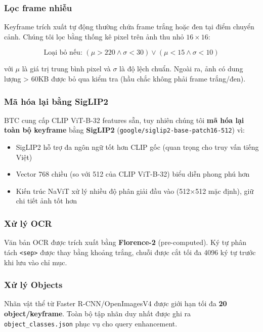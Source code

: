 \documentclass[12pt,a4paper,onecolumn]{article}
\begin{document}
\subsubsection{Lọc frame nhiễu}

Keyframe trích xuất tự động thường chứa frame trắng hoặc đen tại điểm chuyển cảnh. Chúng tôi lọc bằng thống kê pixel trên ảnh thu nhỏ $16 \times 16$:

$$\text{Loại bỏ nếu: } (\mu > 220 \wedge \sigma < 30) \vee (\mu < 15 \wedge \sigma < 10)$$

với $\mu$ là giá trị trung bình pixel và $\sigma$ là độ lệch chuẩn. Ngoài ra, ảnh có dung lượng > 60KB được bỏ qua kiểm tra (hầu chắc không phải frame trắng/đen).

\subsubsection{Mã hóa lại bằng SigLIP2}

BTC cung cấp CLIP ViT-B-32 features sẵn, tuy nhiên chúng tôi \textbf{mã hóa lại toàn bộ keyframe} bằng \textbf{SigLIP2} (\texttt{google/siglip2-base-patch16-512}) vì:

\begin{itemize}
  \item SigLIP2 hỗ trợ đa ngôn ngữ tốt hơn CLIP gốc (quan trọng cho truy vấn tiếng Việt)
  \item Vector 768 chiều (so với 512 của CLIP ViT-B-32) biểu diễn phong phú hơn
  \item Kiến trúc NaViT xử lý nhiều độ phân giải đầu vào (512×512 mặc định), giữ chi tiết ảnh tốt hơn
\end{itemize}


\subsubsection{Xử lý OCR}

Văn bản OCR được trích xuất bằng \textbf{Florence-2} (pre-computed). Ký tự phân tách \texttt{<sep>} được thay bằng khoảng trắng, chuỗi được cắt tối đa 4096 ký tự trước khi lưu vào chỉ mục.

\subsubsection{Xử lý Objects}

Nhãn vật thể từ Faster R-CNN/OpenImagesV4 được giới hạn tối đa \textbf{20 object/keyframe}. Toàn bộ tập nhãn duy nhất được ghi ra \texttt{object\_classes.json} phục vụ cho query enhancement.
\end{document}
